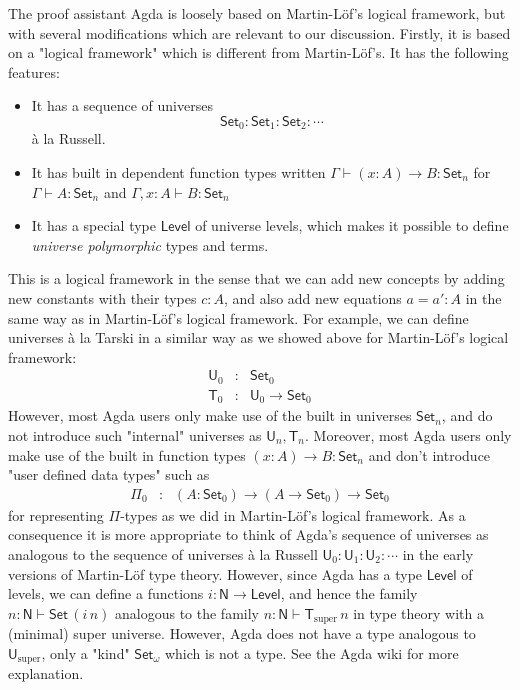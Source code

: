\documentclass[11pt,a4paper]{article}
\def\UU{\mathsf{U}}
\def\Level{\mathsf{Level}}
\newcommand{\N}{\mathsf{N}}
\newcommand{\Set}{\mathsf{Set}}
\newcommand{\T}{\mathsf{T}}
\newcommand{\Usuper}{\UU_{\mathrm{super}}}
\newcommand{\Tsuper}{\T_{\mathrm{super}}}
\begin{document}
The proof assistant Agda is loosely based on Martin-Löf's logical framework, but with several modifications which are relevant to our discussion. Firstly, it is based on a "logical framework" which is different from Martin-Löf's. It has the following features:
\begin{itemize}
\item It has a sequence of universes  $$\Set_0 : \Set_1 : \Set_2 : \cdots$$  \`a la Russell.
\item It has built in dependent function types written $\Gamma \vdash (x : A)\to B : \Set_n$ for $\Gamma \vdash A : \Set_n$ and $\Gamma , x : A \vdash B : \Set_n$
\item It has a special type $\Level$ of universe levels, which makes it possible to define {\em universe polymorphic} types and terms.
\end{itemize}
This is a logical framework in the sense that we can add new concepts by adding new constants with their types $c : A$, and also add new equations $a = a' : A$ in the same way as in Martin-Löf's logical framework. For example, we can define universes \`a la Tarski in a similar way as we showed above for Martin-Löf's logical framework:
\begin{eqnarray*}
\UU_0 &: &\Set_0\\
\T_0 &:& \UU_0 \to \Set_0
\end{eqnarray*}
However, most Agda users only make use of the built in universes $\Set_n$, and do not introduce such "internal" universes as $\UU_n, \T_n$. Moreover, most Agda users only make use of the built in function types $(x : A)\to B : \Set_n$ and don't introduce "user defined data types" such as
\begin{eqnarray*}
\Pi_0 &:& (A:\Set_0) \to (A \to \Set_0) \to \Set_0
\end{eqnarray*}
for representing $\Pi$-types as we did in Martin-Löf's logical framework. As a consequence it is more appropriate to think of Agda's sequence of universes as analogous to the sequence of universes  \`a la Russell $ \UU_0 : \UU_1 : \UU_2 : \cdots$ in the early versions of Martin-Löf type theory. However, since Agda has a type $\Level$ of levels, we can define a functions $i : \N \to \Level$, and hence the family $n : \N \vdash \Set\, (i\, n)$ analogous to the family $n : \N \vdash \Tsuper\,n$ in type theory with a (minimal) super universe. However, Agda does not have a type analogous to $\Usuper$, only a "kind" $\Set_\omega$ which is not a type. See the Agda wiki for more explanation.
\end{document}
